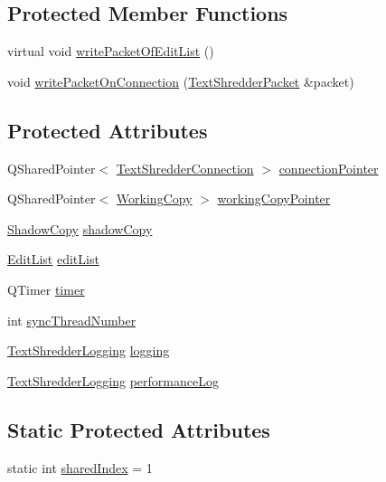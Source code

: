 \subsection*{Protected Member Functions}
\begin{DoxyCompactItemize}
\item 
virtual void \hyperlink{class_sync_thread_ae2a92c2744e665d492f43130757453da}{writePacketOfEditList} ()
\item 
void \hyperlink{class_sync_thread_a954c2e1a65ff3a473c3c7dc5350e0497}{writePacketOnConnection} (\hyperlink{class_text_shredder_packet}{TextShredderPacket} \&packet)
\end{DoxyCompactItemize}
\subsection*{Protected Attributes}
\begin{DoxyCompactItemize}
\item 
QSharedPointer$<$ \hyperlink{class_text_shredder_connection}{TextShredderConnection} $>$ \hyperlink{class_sync_thread_a74e422ec07a67819e7151249e120ccee}{connectionPointer}
\item 
QSharedPointer$<$ \hyperlink{class_working_copy}{WorkingCopy} $>$ \hyperlink{class_sync_thread_a73bbe84d7d531f2e6e728d5ade881270}{workingCopyPointer}
\item 
\hyperlink{class_shadow_copy}{ShadowCopy} \hyperlink{class_sync_thread_aa625d32e516a85a0c56fc2231ecc2916}{shadowCopy}
\item 
\hyperlink{class_edit_list}{EditList} \hyperlink{class_sync_thread_ae3f0fa19b2a0f7ac9abd8ca6d794e616}{editList}
\item 
QTimer \hyperlink{class_sync_thread_ac244e02c977cb8f5614bb2ff19ff1804}{timer}
\item 
int \hyperlink{class_sync_thread_a9500610685e61a7c4fcbc474a9afa642}{syncThreadNumber}
\item 
\hyperlink{class_text_shredder_logging}{TextShredderLogging} \hyperlink{class_sync_thread_ae651d8e4d10f0ecc03da63980712aebd}{logging}
\item 
\hyperlink{class_text_shredder_logging}{TextShredderLogging} \hyperlink{class_sync_thread_a57da771fcaa20bf99c5987ed92ad5c33}{performanceLog}
\end{DoxyCompactItemize}
\subsection*{Static Protected Attributes}
\begin{DoxyCompactItemize}
\item 
static int \hyperlink{class_sync_thread_a2097449d9c853c523c06d48141d80ecb}{sharedIndex} = 1
\end{DoxyCompactItemize}


